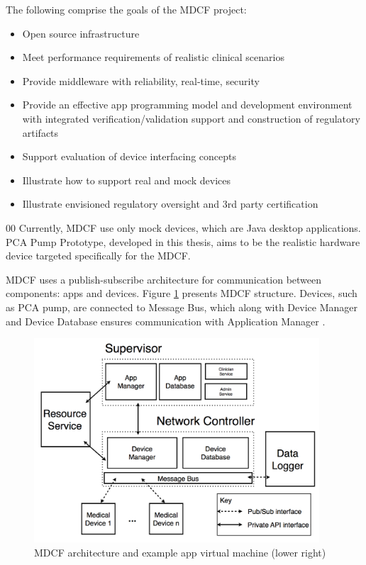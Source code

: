 The following comprise the goals of the MDCF project:
\begin{itemize}
	\item Open source infrastructure
	\item Meet performance requirements of realistic clinical scenarios
	\item Provide middleware with reliability, real-time, security
	\item Provide an effective app programming model and development environment with integrated verification/validation support and construction of regulatory artifacts
	\item Support evaluation of device interfacing concepts
	\item Illustrate how to support real and mock devices
	\item Illustrate envisioned regulatory oversight and 3rd party certification
\end{itemize}
00
Currently, MDCF use only mock devices, which are Java desktop applications. PCA Pump Prototype, developed in this thesis, aims to be the realistic hardware device targeted specifically for the MDCF.

MDCF uses a publish-subscribe architecture for communication between components: apps and devices. Figure \ref{figure:mdcf} presents MDCF structure. Devices, such as PCA pump, are connected to Message Bus, which along with Device Manager and Device Database ensures communication with Application Manager \cite{MedicalApplicationPlatforms:Paper}.

\begin{figure}[ht]%
    \begin{center}
    	\includegraphics[height=3in]{figures/mdcf.png}    	
    \end{center}
    \caption{MDCF architecture and example app virtual machine (lower right)}
    \label{figure:mdcf}
\end{figure}



